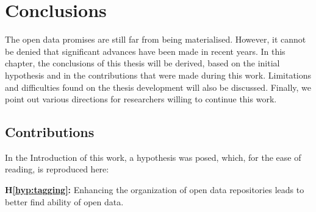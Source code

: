 \chapter{Conclusions}
\label{chap:conclusions}



The open data promises are still far from being materialised.
However, it cannot be denied that significant advances have been made in recent years.
In this chapter, the conclusions of this thesis will be derived, based on the initial hypothesis and in the contributions that were made during this work.
Limitations and difficulties found on the thesis development will also be discussed.
Finally, we point out various directions for researchers willing to continue this work.


\section{Contributions}

In the Introduction of this work, a hypothesis was posed, which, for the ease of reading, is reproduced here:

\noindent\textbf{H\ref{hyp:tagging}:} Enhancing the organization of open data repositories leads to better find ability of open data.


